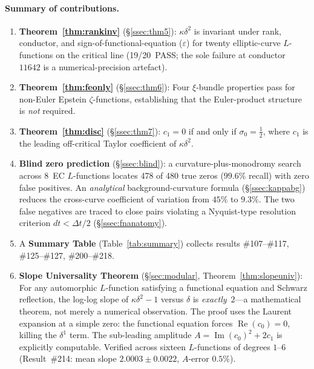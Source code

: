\documentclass[11pt, a4paper]{article}
\theoremstyle{plain}
\theoremstyle{definition}
\begin{document}
\paragraph{Summary of contributions.}
\begin{enumerate}
  \item \textbf{Theorem~\ref{thm:rankinv}} (\S\ref{ssec:thm5}): $\kappa\delta^{2}$ is
        invariant under rank, conductor, and sign-of-functional-equation
        ($\varepsilon$) for twenty elliptic-curve $L$-functions on the
        critical line (19/20~PASS; the sole failure at
        conductor~$11642$ is a numerical-precision artefact).
  \item \textbf{Theorem~\ref{thm:feonly}} (\S\ref{ssec:thm6}): Four $\xi$-bundle
        properties pass for non-Euler Epstein $\zeta$-functions,
        establishing that the Euler-product structure is \emph{not}
        required.
  \item \textbf{Theorem~\ref{thm:disc}} (\S\ref{ssec:thm7}): $c_{1}=0$ if and only
        if $\sigma_{0}=\tfrac{1}{2}$, where $c_{1}$ is the leading
        off-critical Taylor coefficient of $\kappa\delta^{2}$.
  \item \textbf{Blind zero prediction} (\S\ref{ssec:blind}):
        a curvature-plus-monodromy search across 8~EC $L$-functions
        locates 478 of 480 true zeros ($99.6\%$ recall) with zero false
        positives.  An \emph{analytical} background-curvature formula
        (\S\ref{ssec:kappabg}) reduces the cross-curve coefficient of
        variation from $45\%$ to $9.3\%$.  The two false negatives are
        traced to close pairs violating a Nyquist-type resolution
        criterion $dt < \Delta t/2$ (\S\ref{ssec:fnanatomy}).
  \item A \textbf{Summary Table} (Table~\ref{tab:summary}) collects
        results \#107--\#117, \#125--\#127, \#200--\#218.
  \item \textbf{Slope Universality Theorem} (\S\ref{sec:modular},
        Theorem~\ref{thm:slopeuniv}):
        For any automorphic $L$-function satisfying a functional
        equation and Schwarz reflection, the log-log slope of
        $\kappa\delta^{2}-1$ versus $\delta$ is \emph{exactly}~$2$---a
        mathematical theorem, not merely a numerical observation.
        The proof uses the Laurent expansion at a simple zero: the
        functional equation forces $\operatorname{Re}(c_0)=0$,
        killing the $\delta^1$ term.  The sub-leading amplitude
        $A=\operatorname{Im}(c_0)^2+2c_1$ is explicitly computable.
        Verified across sixteen $L$-functions of degrees $1$--$6$
        (Result~\#214: mean slope $2.0003\pm 0.0022$, $A$-error $0.5\%$).
\end{enumerate}
\end{document}
